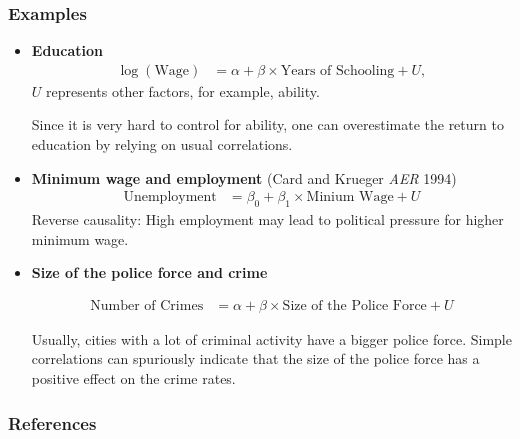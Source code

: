\begin{frame}[allowframebreaks]\frametitle{Examples}
  \begin{itemize}
  \item \textbf{Education} 
    \begin{align*}
    \log (\text{Wage}) &= \alpha + \beta\times \text{Years of
      Schooling} + U,
    \end{align*}
    $U$ represents other factors, for example, ability. 

\medskip
    
    Since it is very hard to
    control for ability, one can overestimate the return to
    education by relying on usual correlations.
  \item \textbf{Minimum wage and employment} (Card and Krueger
    {\slshape AER} 1994)
    \begin{align*}
     \text{Unemployment} &= \beta_0 + \beta_1 \times \text{Minium
      Wage} + U 
      \end{align*}
    Reverse causality: High employment may lead to political
    pressure for higher minimum wage.
  
\framebreak

  \item \textbf{Size of the police force and crime} 
  
    \begin{align*}
    \text{Number of Crimes} &= \alpha + \beta \times \text{Size of
      the Police Force} + U
    \end{align*}
    
    Usually, cities with a lot of criminal activity have a bigger
    police force. Simple correlations can spuriously indicate that
    the size of the police force has a positive effect on the crime
    rates.
  \end{itemize}
\end{frame}


\begin{frame}[allowframebreaks]
  \frametitle{References}
 

\end{frame}



